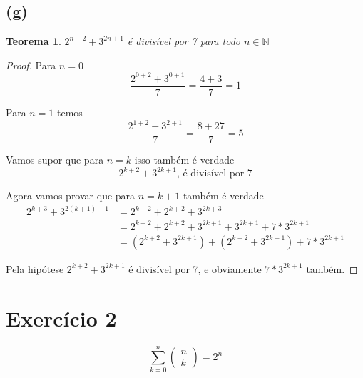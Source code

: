 \documentclass{article}
\begin{document}
\subsection*{(g)}
\newtheorem{teo7}{Teorema}
\begin{teo7}
	$2^{n+2} + 3^{2n+1}$ é divisível por 7 para todo $n \in \mathbb{N^+}$
\end{teo7}
\begin{proof}
	Para $n = 0$
	\begin{equation}
		\dfrac{2^{0 + 2} + 3^{0 + 1}}{7} = \dfrac{4 + 3}{7} = 1
	\end{equation}

	Para $n = 1$ temos
	\begin{equation}
		\dfrac{2^{1+2}+3^{2+1}}{7} = \dfrac{8 + 27}{7} = 5 
	\end{equation}

	Vamos supor que para $n = k$ isso também é verdade
	\begin{equation}
		2^{k+2} + 3^{2k+1}\text{, é divisível por 7}
	\end{equation}

	Agora vamos provar que para $n = k + 1$ também é verdade
	\begin{equation}
	\begin{split}
		2^{k+3} + 3^{2(k+1)+1} & = 2^{k+2} + 2^{k+2} + 3^{2k + 3}\\
		& = 2^{k+2} + 2^{k+2} + 3^{2k+1} + 3^{2k+1} + 7*3^{2k + 1} \\
		& = (2^{k+2} + 3^{2k+1}) + (2^{k+2} + 3^{2k+1}) + 7*3^{2k + 1} 
	\end{split}
	\end{equation}

	Pela hipótese $2^{k+2} + 3^{2k+1}$ é divisível por 7, e obviamente 
	$7*3^{2k+1}$ também.
\end{proof}
\newpage

\section{Exercício 2}
\begin{equation}
	\sum\limits_{k=0}^{n}\left(\begin{array}{c} n \\ k \end{array} \right) = 2^n
\end{equation}
\end{document}
